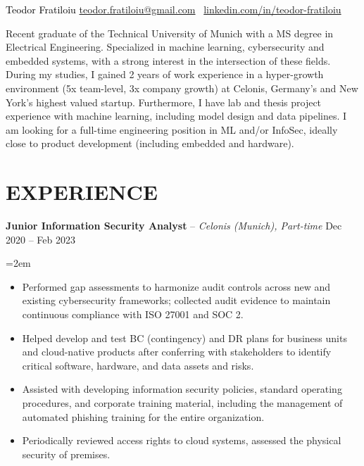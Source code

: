 \documentclass[paper=a4,fontsize=11pt]{scrartcl}
\newcommand{\sepspace}{\vspace*{0.35em}}		%
\newcommand{\NewPart}[1]{\section*{\uppercase{#1}}}
\newcommand{\EducationEntry}[4]{
		\noindent \textit{#1} \hfill      %
		\colorbox{custom_gray}{\color{white}#2} \par  %
		\noindent\hangindent=2em\hangafter=0 \small #3 %
		\normalsize \par}
\newcommand{\WorkEntry}[4]{				  %
		\noindent \textbf{#1} – \textit{#3} \hfill      %
		\colorbox{custom_gray}{\color{white}#2} \par  %
		\noindent\hangindent=2em\hangafter=0 \small #4 %
		\normalsize \par}
\begin{document}
\begin{adjustwidth}{-0.9in}{}
     	\textcolor{black}{
	\parbox[b][2.5cm][c]{21cm}{%
            \huge 
            \centering
            \vspace*{1.5cm}
            \hspace*{3.5cm}Teodor Fratiloiu
            \large
            \newline
            \href{mailto:teodor.fratiloiu@gmail.com}{teodor.fratiloiu@gmail.com} \textbar\
            \href{https://www.linkedin.com/in/teodor-fratiloiu/}{linkedin.com/in/teodor-fratiloiu}
        }
}

\end{adjustwidth}
\vspace{-0.3cm}
Recent graduate of the Technical University of Munich with a MS degree in Electrical Engineering. Specialized in machine learning, cybersecurity and embedded systems, with a strong interest in the intersection of these fields. During my studies, I gained 2 years of work experience in a hyper-growth environment (5x team-level, 3x company growth) at Celonis, Germany's and New York’s highest valued startup. Furthermore, I have lab and thesis project experience with machine learning, including model design and data pipelines. I am looking for a full-time engineering position in ML and/or InfoSec, ideally close to product development (including embedded and hardware).
\vspace{-0.5cm}
\NewPart{Experience}{}
\vspace{-0.3cm}
\WorkEntry{Junior Information Security Analyst}{Dec 2020 – Feb 2023}{Celonis (Munich), Part-time}
{
\begin{itemize}
  \item Performed gap assessments to harmonize audit controls across new and existing cybersecurity frameworks; collected audit evidence to maintain continuous compliance with ISO 27001 and SOC 2.
  \item Helped develop and test BC (contingency) and DR plans for business units and cloud-native products after conferring with stakeholders to identify critical software, hardware, and data assets and risks.
  \item Assisted with developing information security policies, standard operating procedures, and corporate training material, including the management of automated phishing training for the entire organization.
  \item Periodically reviewed access rights to cloud systems, assessed the physical security of premises.
\end{itemize}
}
\end{document}
